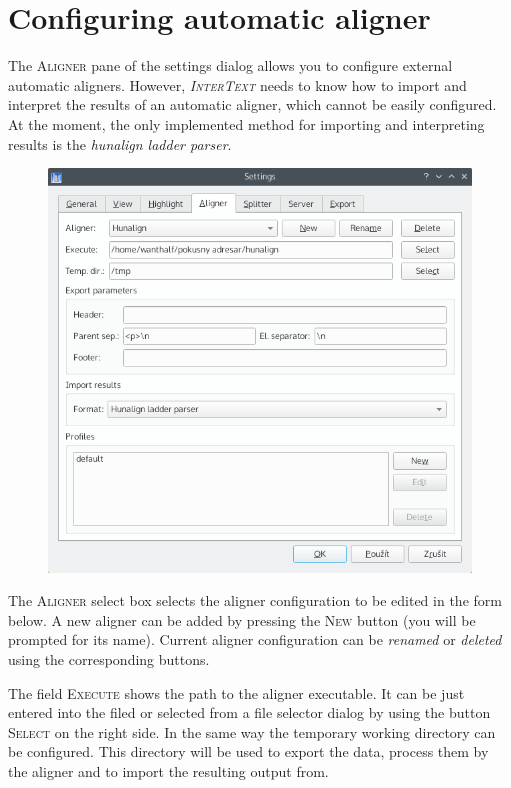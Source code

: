 \documentclass[a4paper,10pt,oneside]{book}
\newcommand{\IT}{\textit{\textsc{InterText}}\xspace}
\newcommand{\menu}[1]{\textsc{#1}}
\begin{document}
\newpage
\section{Configuring automatic aligner}\label{ch:detail:config:aligner}

The \menu{Aligner} pane of the settings dialog allows you to configure external automatic aligners. However, \IT needs to know how to import and interpret the results of an automatic aligner, which cannot be easily configured. At the moment, the only implemented method for importing and interpreting results is the \emph{hunalign ladder parser}.

\begin{figure}[htb]
 \includegraphics[width=\textwidth]{screenshots/settings_aligner.png}
\end{figure}

The \menu{Aligner} select box selects the aligner configuration to be edited in the form below. A new aligner can be added by pressing the \menu{New} button (you will be prompted for its name). Current aligner configuration can be \emph{renamed} or \emph{deleted} using the corresponding buttons.

The field \menu{Execute} shows the path to the aligner executable. It can be just entered into the filed or selected from a file selector dialog by using the button \menu{Select} on the right side. In the same way the temporary working directory can be configured. This directory will be used to export the data, process them by the aligner and to import the resulting output from.
\end{document}
